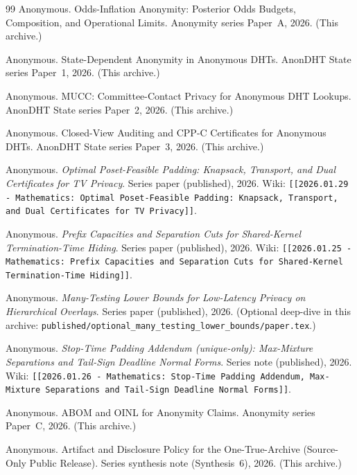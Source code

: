 \documentclass[11pt]{article}
\begin{document}
\begin{thebibliography}{99}
Anonymous.
\newblock Odds-Inflation Anonymity: Posterior Odds Budgets, Composition, and Operational Limits.
\newblock Anonymity series Paper~A, 2026. (This archive.)

Anonymous.
\newblock State-Dependent Anonymity in Anonymous DHTs.
\newblock AnonDHT State series Paper~1, 2026. (This archive.)

Anonymous.
\newblock MUCC: Committee-Contact Privacy for Anonymous DHT Lookups.
\newblock AnonDHT State series Paper~2, 2026. (This archive.)

Anonymous.
\newblock Closed-View Auditing and CPP-C Certificates for Anonymous DHTs.
\newblock AnonDHT State series Paper~3, 2026. (This archive.)

Anonymous.
\newblock \emph{Optimal Poset-Feasible Padding: Knapsack, Transport, and Dual Certificates for TV Privacy}.
\newblock Series paper (published), 2026.
\newblock Wiki: \texttt{[[2026.01.29 - Mathematics: Optimal Poset-Feasible Padding: Knapsack, Transport, and Dual Certificates for TV Privacy]]}.


Anonymous.
\newblock \emph{Prefix Capacities and Separation Cuts for Shared-Kernel Termination-Time Hiding}.
\newblock Series paper (published), 2026.
\newblock Wiki: \texttt{[[2026.01.25 - Mathematics: Prefix Capacities and Separation Cuts for Shared-Kernel Termination-Time Hiding]]}.


Anonymous.
\newblock \emph{Many-Testing Lower Bounds for Low-Latency Privacy on Hierarchical Overlays}.
\newblock Series paper (published), 2026. (Optional deep-dive in this archive: \texttt{published/optional\_many\_testing\_lower\_bounds/paper.tex}.)


Anonymous.
\newblock \emph{Stop-Time Padding Addendum (unique-only): Max-Mixture Separations and Tail-Sign Deadline Normal Forms}.
\newblock Series note (published), 2026.
\newblock Wiki: \texttt{[[2026.01.26 - Mathematics: Stop-Time Padding Addendum, Max-Mixture Separations and Tail-Sign Deadline Normal Forms]]}.


Anonymous.
\newblock ABOM and OINL for Anonymity Claims.
\newblock Anonymity series Paper~C, 2026. (This archive.)

Anonymous.
\newblock Artifact and Disclosure Policy for the One-True-Archive (Source-Only Public Release).
\newblock Series synthesis note (Synthesis~6), 2026. (This archive.)


\end{thebibliography}
\end{document}
